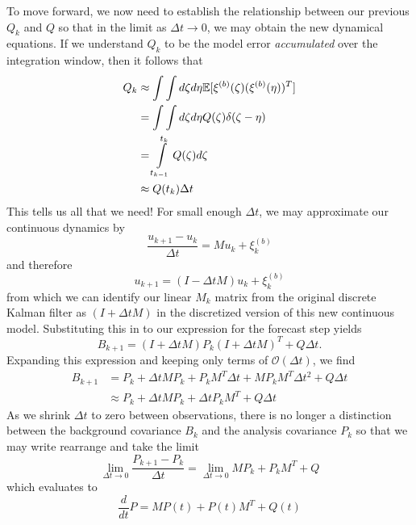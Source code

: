 To move forward, we now need to establish the relationship between our previous $Q_k$ and $Q$ so that in the limit as $\Delta t\to 0$, we may obtain the new dynamical equations. If we understand $Q_k$ to be the model error \textit{accumulated} over the integration window, then it follows that
\begin{equation}
  \begin{aligned}
    Q_k &\approx \int \int d\zeta d\eta \mathbb{E}[\xi^{(b)}(\zeta)(\xi^{(b)}(\eta))^T] \\
    &= \int \int d\zeta d\eta Q(\zeta)\delta(\zeta - \eta) \\
    &= \int\limits_{t_{k-1}}^{t_k}Q(\zeta)d\zeta \\
    &\approx Q(t_k)\Delta t
  \end{aligned}
\end{equation}
This tells us all that we need! For small enough $\Delta t$, we may approximate our continuous dynamics by
\begin{equation}
  \frac{u_{k+1}-u_{k}}{\Delta t} = Mu_k + \xi^{(b)}_k
\end{equation}
and therefore
\begin{equation}
  u_{k+1} = (I-\Delta t M)u_{k} + \xi^{(b)}_k
\end{equation}
from which we can identify our linear $M_k$ matrix from the original discrete Kalman filter as $(I+\Delta t M)$ in the discretized version of this new continuous model. Substituting this in to our expression for the forecast step yields
\begin{equation}
  B_{k+1} = \left(I + \Delta t M \right)P_k\left(I + \Delta t M \right)^T + Q\Delta t.
\end{equation}
Expanding this expression and keeping only terms of $\mathcal{O}(\Delta t)$, we find
\begin{equation}
  \begin{aligned}
  B_{k+1} &= P_k + \Delta t MP_k + P_kM^T\Delta t + MP_kM^T\Delta t^2 + Q\Delta t \\
  &\approx P_k + \Delta t M P_k + \Delta t P_k M^T + Q\Delta t
  \end{aligned}
\end{equation}
As we shrink $\Delta t$ to zero between observations, there is no longer a distinction between the background covariance $B_k$ and the analysis covariance $P_k$ so that we may write rearrange and take the limit
\begin{equation}
  \lim_{\Delta t \to 0}\frac{P_{k+1}-P_k}{\Delta t} = \lim_{\Delta t \to 0} MP_k + P_kM^T + Q
\end{equation}
which evaluates to
\begin{equation}
  \boxed{\frac{d}{dt}P = MP(t) + P(t)M^T + Q(t)}
\end{equation}

